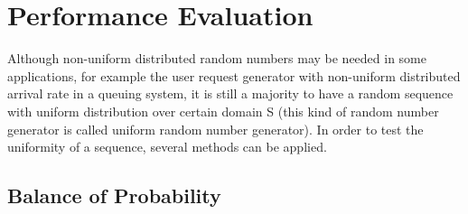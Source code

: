 \chapter{Performance Evaluation}
\label{Performance Evaluation}
\minitoc

Although non-uniform distributed random numbers may be needed in some applications,
for example the user request generator with non-uniform distributed arrival rate in a queuing
system, it is still a majority to have a random sequence with uniform distribution over certain
domain S (this kind of random number generator is called uniform random number generator). 
In order to test the uniformity of a sequence, several methods can be applied.

\section{Balance of Probability}


